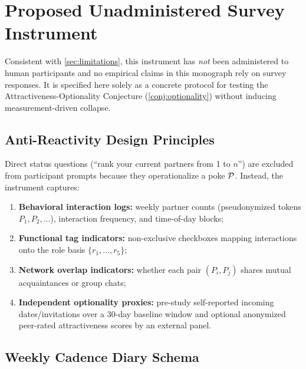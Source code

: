 \section{Proposed Unadministered Survey Instrument}
\label{app:instrument}

Consistent with \cref{sec:limitations}, this instrument has \emph{not} been
administered to human participants and no empirical claims in this monograph
rely on survey responses. It is specified here solely as a concrete protocol
for testing the Attractiveness-Optionality Conjecture (\cref{conj:optionality})
without inducing measurement-driven collapse.

\subsection{Anti-Reactivity Design Principles}
\label{app:inst-principles}

Direct status questions (``rank your current partners from 1 to $n$'') are
excluded from participant prompts because they operationalize a poke $\mathcal{P}$.
Instead, the instrument captures:
\begin{enumerate}[nosep]
  \item \textbf{Behavioral interaction logs:} weekly partner counts (pseudonymized
        tokens $P_1, P_2, \dots$), interaction frequency, and time-of-day blocks;
  \item \textbf{Functional tag indicators:} non-exclusive checkboxes mapping
        interactions onto the role basis $\{r_1, \dots, r_5\}$;
  \item \textbf{Network overlap indicators:} whether each pair $(P_i, P_j)$
        shares mutual acquaintances or group chats;
  \item \textbf{Independent optionality proxies:} pre-study self-reported incoming
        dates/invitations over a $30$-day baseline window and optional anonymized
        peer-rated attractiveness scores by an external panel.
\end{enumerate}

\subsection{Weekly Cadence Diary Schema}
\label{app:inst-schema}

